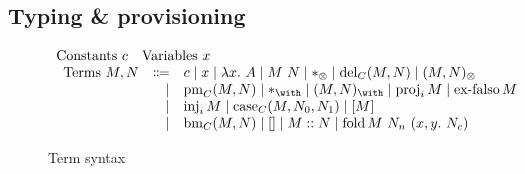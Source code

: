 \subsection{Typing \& provisioning}
\label{sec:rules}

\begin{figure}
  \begin{displaymath}
    \begin{array}{l}
      \textrm{Constants}~c \quad \textrm{Variables}~x \\
      \begin{array}{rrl}
        \textrm{Terms}~M, N & \Coloneqq & c \mid x \mid \lam{x}{A} \mid
                                          \app{M}{N} \mid \unit \mid
                                          \del{C}{M}{N} \mid \ten{M}{N} \\
                            & \mid & \prm{C}{M}{x}{y}{N} \mid \eat \mid
                                     \wth{M}{N} \mid \proj{i}{M} \mid
                                     \exf{C}{M} \\
                            & \mid & \inj{i}{M} \mid \cse{C}{M}{x}{N_0}{y}{N_1}
                                     \mid \bang{M} \\
                            & \mid & \bm{C}{M}{x}{N} \mid \nil \mid \cons{M}{N}
                                     \mid \fold{M}{N_n}{x}{y}{N_c}
      \end{array}
    \end{array}
  \end{displaymath}
  \caption{Term syntax}
  \label{fig:terms}
\end{figure}

